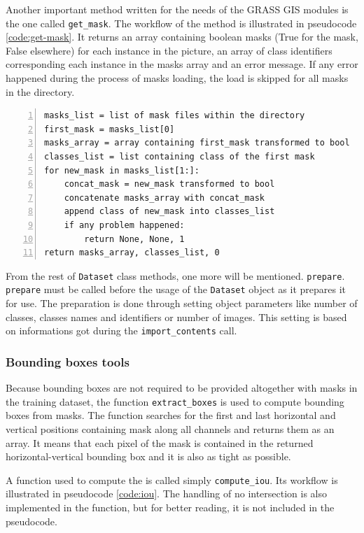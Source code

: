 Another important method written for the needs of the GRASS GIS modules is the 
one called \verb|get_mask|. The workflow of the method is illustrated in 
pseudocode \ref{code:get-mask}. It returns an array containing boolean masks 
(True for the mask, False elsewhere) for each instance in the picture, an array 
of class identifiers corresponding each instance in the masks array and an error 
message. If any error happened during the process of masks loading, the load is 
skipped for all masks in the directory.

{\scriptsize
\begin{lstlisting}[style=python, caption={get\_mask}, captionpos=b, 
label=code:get-mask, deletekeywords={class},
backgroundcolor = \color{light-gray}, numbers=left, breaklines=true]
masks_list = list of mask files within the directory
first_mask = masks_list[0]
masks_array = array containing first_mask transformed to bool
classes_list = list containing class of the first mask
for new_mask in masks_list[1:]:
    concat_mask = new_mask transformed to bool
    concatenate masks_array with concat_mask
    append class of new_mask into classes_list
    if any problem happened:
        return None, None, 1
return masks_array, classes_list, 0
\end{lstlisting}}

From the rest of \verb|Dataset| class methods, one more will be mentioned. 
\verb|prepare|. \verb|prepare| must be called before the usage of the 
\verb|Dataset| object as it prepares it for use. The preparation is done through 
setting object parameters like number of classes, classes names and identifiers 
or number of images. This setting is based on informations got during the 
\verb|import_contents| call.

\subsubsection{Bounding boxes tools}
\label{bbox-funcs}

Because bounding boxes are not required to be provided altogether with masks in 
the training dataset, the function \verb|extract_boxes| is used to compute 
bounding boxes from masks. The function searches for the first and last 
horizontal and vertical positions containing mask along all channels and returns 
them as an array. It means that each pixel of the mask is contained in the 
returned horizontal-vertical bounding box and it is also as tight as possible.

A function used to compute the  is called simply \verb|compute_iou|. Its 
workflow is illustrated in pseudocode \ref{code:iou}. The handling of no 
intersection is also implemented in the function, but for better reading, it is 
not included in the pseudocode.

